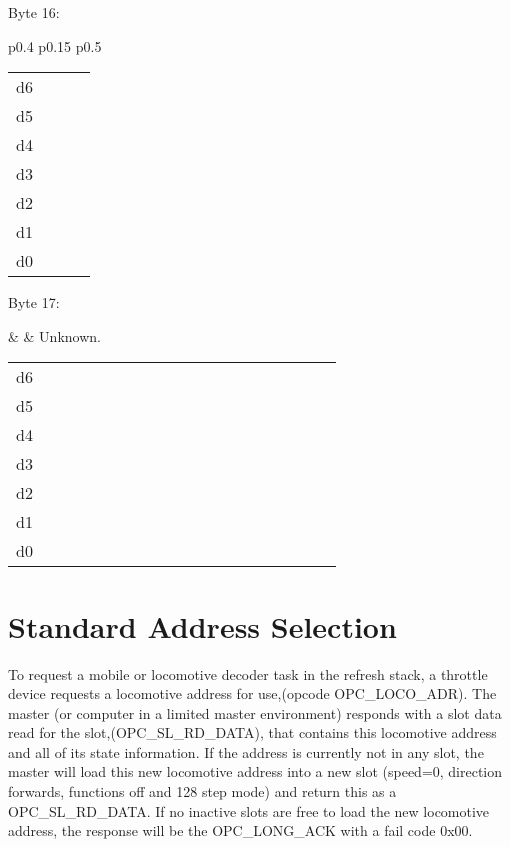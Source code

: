 Byte 16:

\begin{tabular}{p{0.4\linewidth} p{0.15\linewidth} p{0.5\linewidth}} 

\begin{tabular}{|p{0.3cm}|p{0.3cm}|p{0.3cm}|p{0.3cm}|p{0.3cm}|p{0.3cm}|p{0.3cm}|p{0.3cm}|}
\hline
0 & d6 & d5 & d4 & d3 & d2 & d1 & d0\\
\hline
\end{tabular}
&  & Unknown.\\
\end{tabular}

\begin{tabular}{p{0.05\linewidth} p{0.6\linewidth}} 
d6 & \\
d5 & \\
d4 & \\
d3 & \\
d2 & \\
d1 & \\
d0 & \\
\end{tabular}

Byte 17:

&  & Unknown.\\
\end{tabular}

\begin{tabular}{p{0.05\linewidth} p{0.6\linewidth}} 
d6 & \\
d5 & \\
d4 & \\
d3 & \\
d2 & \\
d1 & \\
d0 & \\
\end{tabular}

\section{Standard Address Selection}

To request a mobile or locomotive decoder task in the refresh stack, a throttle device requests a locomotive address for use,(opcode OPC\_LOCO\_ADR). The master (or computer in a limited master environment) responds with a slot data read for the slot,(OPC\_SL\_RD\_DATA), that contains this locomotive address and all of its state information. If the address is currently not in any slot, the master will load this new locomotive address into a new slot (speed=0, direction forwards, functions off and 128 step mode) and return this as a OPC\_SL\_RD\_DATA. If no inactive slots are free to load the new locomotive address, the response will be the OPC\_LONG\_ACK with a fail code 0x00.

